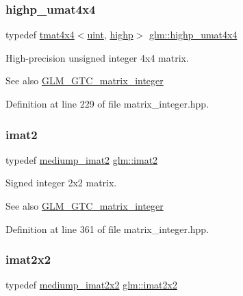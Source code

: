 \subsubsection{\texorpdfstring{highp\_umat4x4}{highp\_umat4x4}}
{\footnotesize\ttfamily typedef \mbox{\hyperlink{structglm_1_1tmat4x4}{tmat4x4}}$<$\mbox{\hyperlink{group__core__precision_ga4fd29415871152bfb5abd588334147c8}{uint}}, \mbox{\hyperlink{namespaceglm_a0f04f086094c747d227af4425893f545ac6f7eab42eacbb10d59a58e95e362074}{highp}}$>$ \mbox{\hyperlink{group__gtc__matrix__integer_gaf5365128f6fd506442843fb5a441f385}{glm\+::highp\+\_\+umat4x4}}}

High-\/precision unsigned integer 4x4 matrix. \begin{DoxySeeAlso}{See also}
\mbox{\hyperlink{group__gtc__matrix__integer}{G\+L\+M\+\_\+\+G\+T\+C\+\_\+matrix\+\_\+integer}} 
\end{DoxySeeAlso}


Definition at line 229 of file matrix\+\_\+integer.\+hpp.

\mbox{\label{group__gtc__matrix__integer_ga77a581b3366fb63fc72f8f20830003e0}} 
\subsubsection{\texorpdfstring{imat2}{imat2}}
{\footnotesize\ttfamily typedef \mbox{\hyperlink{group__gtc__matrix__integer_gae812330b83568359273b6ec96b002863}{mediump\+\_\+imat2}} \mbox{\hyperlink{group__gtc__matrix__integer_ga77a581b3366fb63fc72f8f20830003e0}{glm\+::imat2}}}

Signed integer 2x2 matrix. \begin{DoxySeeAlso}{See also}
\mbox{\hyperlink{group__gtc__matrix__integer}{G\+L\+M\+\_\+\+G\+T\+C\+\_\+matrix\+\_\+integer}} 
\end{DoxySeeAlso}


Definition at line 361 of file matrix\+\_\+integer.\+hpp.

\mbox{\label{group__gtc__matrix__integer_gaf7f44f44d966377666d41ed059524732}} 
\subsubsection{\texorpdfstring{imat2x2}{imat2x2}}
{\footnotesize\ttfamily typedef \mbox{\hyperlink{group__gtc__matrix__integer_ga52a40f2f95562746fd8084726a300963}{mediump\+\_\+imat2x2}} \mbox{\hyperlink{group__gtc__matrix__integer_gaf7f44f44d966377666d41ed059524732}{glm\+::imat2x2}}}

